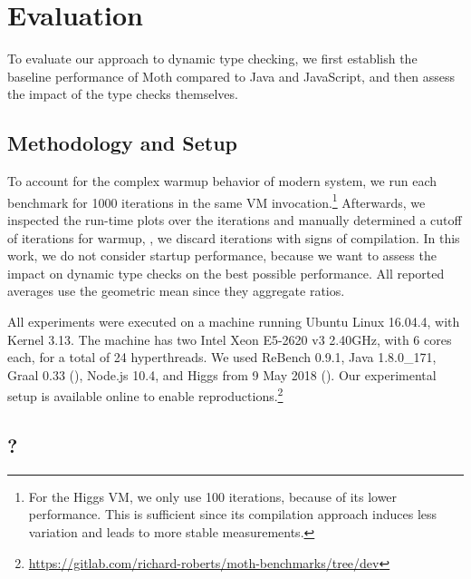 
\section{Evaluation}
\label{sec:evaluation}

\newcommand{\NumIterationsAll}{1000\xspace}
\newcommand{\NumIterationsHiggs}{100\xspace}


To evaluate our approach to dynamic type checking,
we first establish the baseline performance of Moth
compared to Java and JavaScript,
and then assess the impact of the type checks themselves.

\subsection{Methodology and Setup}

To account for the complex warmup behavior
of modern system\citep{Barrett:2017:VMW},
we run each benchmark for \NumIterationsAll iterations in the same
VM invocation.\footnote{
For the Higgs VM, we only use \NumIterationsHiggs iterations,
because of its lower performance.
This is sufficient since its compilation approach induces less variation
and leads to more stable measurements.}
Afterwards, we inspected the run-time plots over the iterations
and manually determined a cutoff of \WarmupCutOff iterations for warmup,
\ie, we discard iterations with signs of compilation.
In this work, we do not consider startup performance,
because we want to assess the impact on dynamic type checks
on the best possible performance.
All reported averages use the geometric mean since they aggregate ratios.

All experiments were executed on a machine running Ubuntu Linux 16.04.4,
with Kernel 3.13.
The machine has two Intel Xeon E5-2620 v3 2.40GHz,
with 6 cores each, for a total of 24 hyperthreads.
We used ReBench 0.9.1, Java 1.8.0\_171, Graal 0.33 (),
Node.js 10.4, and Higgs from 9 May 2018 ().
Our experimental setup is available online to enable reproductions.\footnote{
\url{https://gitlab.com/richard-roberts/moth-benchmarks/tree/dev}}


\subsection{\AWFY?}
\label{sec:baseline-perf}


